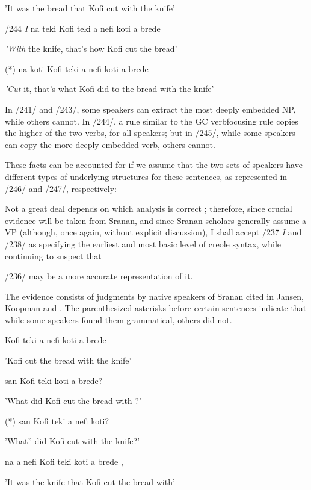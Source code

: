 'It was the bread that Kofi cut with the knife'

/244 \textit{I} na teki Kofi teki a nefi koti a brede

\textit{'With} the knife, that's how Kofi cut the bread'

\ea\label{ex:245}
 (*) na koti Kofi teki a nefi koti a brede
\glt
\z

\textit{'Cut} it, that's what Kofi did to the bread with the knife'

In /241/ and /243/, some speakers can extract the most deeply embed\-ded NP, while others cannot. In /244/, a rule similar to the GC verb\-focusing rule copies the higher of the two verbs, for all speakers; but in /245/, while some speakers can copy the more deeply embedded verb, others cannot.

These facts can be accounted for if we assume that the two sets of speakers have different types of underlying structures for these sentences, as represented in /246/ and /247/, respectively:

Not a great deal depends on which analysis is correct ; therefore, since crucial evidence will be taken from Sranan, and since Sranan scholars generally assume a VP (although, once again, without explicit discussion), I shall accept /237 \textit{I} and /238/ as specifying the earliest and most basic level of creole syntax, while continuing to suspect that

/236/ may be a more accurate representation of it.

The evidence consists of judgments by native speakers of Sranan cited in Jansen, Koopman and \citet{Muysken1978}. The parenthesized asterisks before certain sentences indicate that while some speakers found them grammatical, others did not.

\ea\label{ex:239}
 Kofi teki a nefi koti a brede
\glt
\z

'Kofi cut the bread with the knife'

\ea\label{ex:240}
 san Kofi teki koti a brede?
\glt
\z

'What did Kofi cut the bread with ?'

\ea\label{ex:241}
 (*) san Kofi teki a nefi koti?
\glt
\z

'What'' did Kofi cut with the knife?'

\ea\label{ex:242}
 na a nefi Kofi teki koti a brede ,
\glt
\z

'It was the knife that Kofi cut the bread with'

\ea\label{ex:246}


